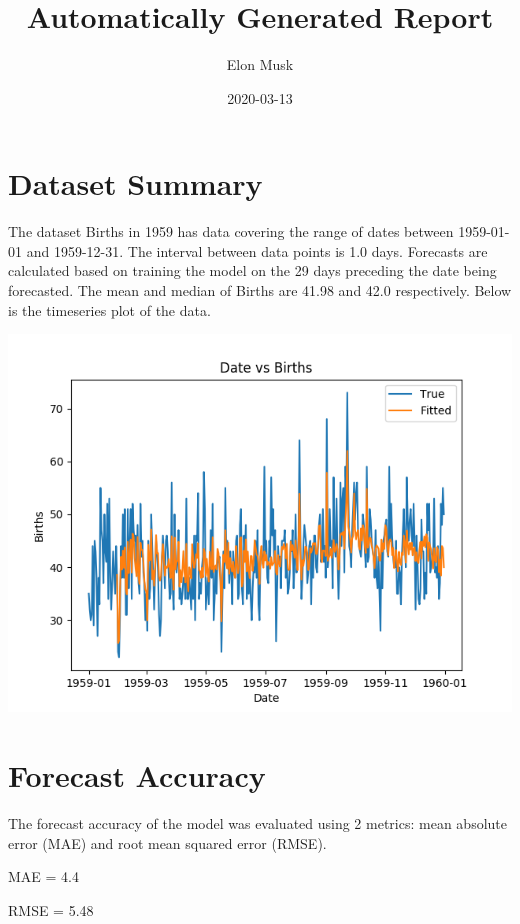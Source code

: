 \documentclass {article}
\begin{document}
    \title {Automatically Generated Report}
    \author {Elon Musk}
    \date {2020-03-13}
    \maketitle

    \section {Dataset Summary}

    The dataset Births in 1959 has data covering the range of dates between 1959-01-01 and
    1959-12-31. The interval between data points is 1.0 days. Forecasts are calculated
    based on training the model on the 29 days preceding the date being forecasted. The
    mean and median of Births are 41.98 and 42.0
    respectively. Below is the timeseries plot of the data.
    
    \begin {center}
    \includegraphics[scale=0.8]{basic_plot.png}
    \end {center}

    \section {Forecast Accuracy}

    The forecast accuracy of the model was evaluated using 2 metrics: mean absolute error (MAE) and root
    mean squared error (RMSE).

    MAE = 4.4

    RMSE = 5.48
\end{document}
